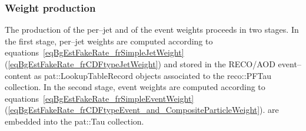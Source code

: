 \subsubsection{Weight production}
\label{secAppendixWeightProduction}

The production of the per--jet and of the event weights proceeds in two stages.
In the first stage, per--jet weights are computed according to
equations~\ref{eqBgEstFakeRate_frSimpleJetWeight} (\ref{eqBgEstFakeRate_frCDFtypeJetWeight})
and stored in the RECO/AOD event--content as pat::LookupTableRecord objects
associated to the reco::PFTau collection.  In the second stage, event
weights are computed according to
equations~\ref{eqBgEstFakeRate_frSimpleEventWeight} (\ref{eqBgEstFakeRate_frCDFtypeEvent_and_CompositeParticleWeight}).
are embedded into the pat::Tau collection.

